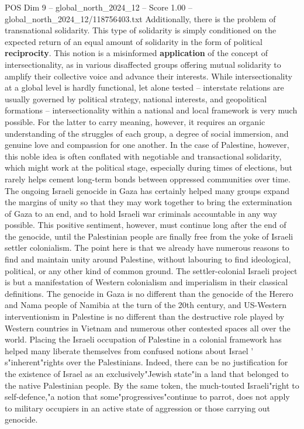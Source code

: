 \begin{textsample}{POS Dim 9 – global\_north\_2024\_12 – Score 1.00 – global\_north\_2024\_12/118756403.txt}
Additionally, there is the problem of transnational solidarity.
This type of solidarity is simply conditioned on the expected return of an equal amount of solidarity in the form of political \textbf{reciprocity}.
This notion is a misinformed \textbf{application} of the concept of intersectionality, as in various disaffected groups offering mutual solidarity to amplify their collective voice and advance their interests.
While intersectionality at a global level is hardly functional, let alone tested -- interstate relations are usually governed by political strategy, national interests, and geopolitical formations -- intersectionality within a national and local framework is very much possible.
For the latter to carry meaning, however, it requires an organic understanding of the struggles of each group, a degree of social immersion, and genuine love and compassion for one another.
In the case of Palestine, however, this noble idea is often conflated with negotiable and transactional solidarity, which might work at the political stage, especially during times of elections, but rarely helps cement long-term bonds between oppressed communities over time.
The ongoing Israeli genocide in Gaza has certainly helped many groups expand the margins of unity so that they may work together to bring the extermination of Gaza to an end, and to hold Israeli war criminals accountable in any way possible.
This positive sentiment, however, must continue long after the end of the genocide, until the Palestinian people are finally free from the yoke of Israeli settler colonialism.
The point here is that we already have numerous reasons to find and maintain unity around Palestine, without labouring to find ideological, political, or any other kind of common ground.
The settler-colonial Israeli project is but a manifestation of Western colonialism and imperialism in their classical definitions.
The genocide in Gaza is no different than the genocide of the Herero and Nama people of Namibia at the turn of the 20th century, and US-Western interventionism in Palestine is no different than the destructive role played by Western countries in Vietnam and numerous other contested spaces all over the world.
Placing the Israeli occupation of Palestine in a colonial framework has helped many liberate themselves from confused notions about Israel ' s"inherent"rights over the Palestinians.
Indeed, there can be no justification for the existence of Israel as an exclusively"Jewish state"in a land that belonged to the native Palestinian people.
By the same token, the much-touted Israeli"right to self-defence,"a notion that some"progressives"continue to parrot, does not apply to military occupiers in an active state of aggression or those carrying out genocide.

\end{textsample}
